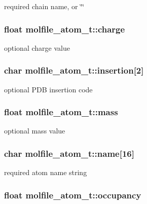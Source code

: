 required chain name, or \char`\"{}\char`\"{} \hypertarget{structmolfile__atom__t_ab0d78f9de3ebe2c30594d025761eb77d}{
\subsubsection[{charge}]{\setlength{\rightskip}{0pt plus 5cm}float {\bf molfile\-\_\-atom\-\_\-t\-::charge}}}\label{structmolfile__atom__t_ab0d78f9de3ebe2c30594d025761eb77d}
optional charge value \hypertarget{structmolfile__atom__t_acfa3d94213fe2cd6bddf115a1e587e80}{
\subsubsection[{insertion}]{\setlength{\rightskip}{0pt plus 5cm}char {\bf molfile\-\_\-atom\-\_\-t\-::insertion}\mbox{[}2\mbox{]}}}\label{structmolfile__atom__t_acfa3d94213fe2cd6bddf115a1e587e80}
optional \-P\-D\-B insertion code \hypertarget{structmolfile__atom__t_ac061a678359fcb37f75f330e485b9926}{
\subsubsection[{mass}]{\setlength{\rightskip}{0pt plus 5cm}float {\bf molfile\-\_\-atom\-\_\-t\-::mass}}}\label{structmolfile__atom__t_ac061a678359fcb37f75f330e485b9926}
optional mass value \hypertarget{structmolfile__atom__t_a34d5b21ed78a1253bf667bca88432ec0}{
\subsubsection[{name}]{\setlength{\rightskip}{0pt plus 5cm}char {\bf molfile\-\_\-atom\-\_\-t\-::name}\mbox{[}16\mbox{]}}}\label{structmolfile__atom__t_a34d5b21ed78a1253bf667bca88432ec0}
required atom name string \hypertarget{structmolfile__atom__t_af2dca5440e0aa9b9161f3135fc5a873d}{
\subsubsection[{occupancy}]{\setlength{\rightskip}{0pt plus 5cm}float {\bf molfile\-\_\-atom\-\_\-t\-::occupancy}}}\label{structmolfile__atom__t_af2dca5440e0aa9b9161f3135fc5a873d}
